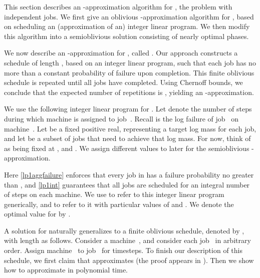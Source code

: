 
This section describes an -approximation algorithm for
\suui, the \suu problem with independent jobs.  We first give an
oblivious -approximation algorithm for \suui, based on
scheduling an (approximation of an) integer linear program.  We then
modify this algorithm into a semioblivious solution consisting of
 nearly optimal phases.  


We now describe an -approximation for \suui, called
\ALGobl. 
Our approach constructs a schedule of length
, based on an integer linear program, such that each job
has no more than a constant probability of failure upon completion.
This finite oblivious schedule is repeated until all jobs have completed. 
Using Chernoff bounds, we conclude that the expected number of repetitions is 
,  yielding an -approximation.

We use the following integer linear program for \ALGobl.  Let 
denote the number of steps during which machine  is assigned to
job~.  Recall  is the log failure of
job~ on machine~.  Let  be a fixed positive real,
representing a target log mass for each job, and let 
be a subset of jobs that need to achieve that log mass.  For now,
think of  as being fixed at , and .  We assign
different values to  later for the semioblivious -approximation.

Here \eqref{lp1aggfailure} enforces that every
job in  has a failure probability no greater than
, and 
\eqref{lp1int} guarantees that all jobs
are scheduled for an integral number of steps on each machine.
We use  to refer to this integer linear program
generically, and  to refer to it with particular 
values of  and .  We denote the optimal value for 
by .



A solution for  naturally generalizes to a finite
oblivious schedule, denoted by , with
length  as follows.  Consider a machine~,
and consider each job~ in arbitrary order.  Assign machine~ to
job~ for  timesteps. To finish our description of this schedule, 
we first claim that  approximates  
(the proof appears in ).
Then we show how to approximate  in polynomial time.

